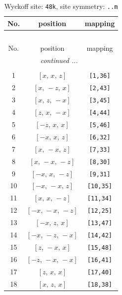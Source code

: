\documentclass[fleqn,8pt]{jsarticle}
\begin{document}
\begin{longtable}{ccc}
\caption{Wyckoff site: {\tt 48k}, site symmetry: {\tt ..m}}
 \\
 \hline \hline
No. & position & mapping \\ \hline \endfirsthead

\multicolumn{2}{l}{\tablename\ \thetable{}} \\
 \hline \hline
No. & position & mapping \\ \hline \endhead

 \hline \hline
\multicolumn{2}{r}{\footnotesize\it continued ...} \\ \endfoot

 \hline \hline
\multicolumn{2}{r}{} \\ \endlastfoot

1 & $\left[ x,\, x,\, z \right]$ & {\tt [1,36]} \\ \hline
2 & $\left[ x,\, - z,\, x \right]$ & {\tt [2,43]} \\ \hline
3 & $\left[ x,\, z,\, - x \right]$ & {\tt [3,45]} \\ \hline
4 & $\left[ z,\, x,\, - x \right]$ & {\tt [4,44]} \\ \hline
5 & $\left[ - z,\, x,\, x \right]$ & {\tt [5,46]} \\ \hline
6 & $\left[ - x,\, x,\, z \right]$ & {\tt [6,32]} \\ \hline
7 & $\left[ x,\, - x,\, z \right]$ & {\tt [7,33]} \\ \hline
8 & $\left[ x,\, - x,\, - z \right]$ & {\tt [8,30]} \\ \hline
9 & $\left[ - x,\, x,\, - z \right]$ & {\tt [9,31]} \\ \hline
10 & $\left[ - x,\, - x,\, z \right]$ & {\tt [10,35]} \\ \hline
11 & $\left[ x,\, x,\, - z \right]$ & {\tt [11,34]} \\ \hline
12 & $\left[ - x,\, - x,\, - z \right]$ & {\tt [12,25]} \\ \hline
13 & $\left[ - x,\, z,\, x \right]$ & {\tt [13,47]} \\ \hline
14 & $\left[ - x,\, - z,\, - x \right]$ & {\tt [14,42]} \\ \hline
15 & $\left[ z,\, - x,\, x \right]$ & {\tt [15,48]} \\ \hline
16 & $\left[ - z,\, - x,\, - x \right]$ & {\tt [16,41]} \\ \hline
17 & $\left[ z,\, x,\, x \right]$ & {\tt [17,40]} \\ \hline
18 & $\left[ x,\, z,\, x \right]$ & {\tt [18,38]} \\ \hline

\end{longtable}
\end{document}

